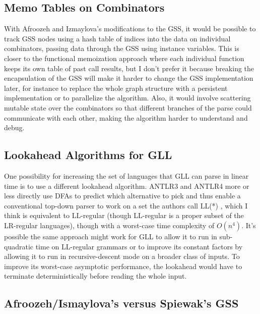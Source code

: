 \documentclass[12pt]{article}
\begin{document}
\subsection{Memo Tables on Combinators}
\label{sec:memo_tables}

With Afroozeh and Izmaylova's modifications to the GSS, it would be
possible to track GSS nodes using a hash table of indices into the
data on individual combinators, passing data through the GSS using
instance variables.  This is closer to the functional memoization
approach where each individual function keeps its own table of past
call results, but I don't prefer it because breaking the encapsulation
of the GSS will make it harder to change the GSS implementation later,
for instance to replace the whole graph structure with a persistent
implementation or to parallelize the algorithm.  Also, it would
involve scattering mutable state over the combinators so that
different branches of the parse could communicate with each other,
making the algorithm harder to understand and debug.



\subsection{Lookahead Algorithms for GLL}
\label{sec:gll_lookahead}

One possibility for increasing the set of languages that GLL can parse
in linear time is to use a different lookahead algorithm.  ANTLR3 and
ANTLR4 more or less directly use DFAs to predict which alternative to
pick and thus enable a conventional top-down parser to work on a set
the authors call LL(*) \parencites{antlr3, antlr4}, which I think is
equivalent to LL-regular (though LL-regular is a proper subset of the
LR-regular languages\parencite{ll-regular}), though with a worst-case
time complexity of $O(n^4)$.  It's possible the same approach might
work for GLL to allow it to run in sub-quadratic time on LL-regular
grammars or to improve its constant factors by allowing it to run in
recursive-descent mode on a broader class of inputs.  To improve its
worst-case asymptotic performance, the lookahead would have to
terminate deterministically before reading the whole input.


\subsection{Afroozeh/Ismaylova's versus Spiewak's GSS}
\label{sec:gss_details}
\end{document}
